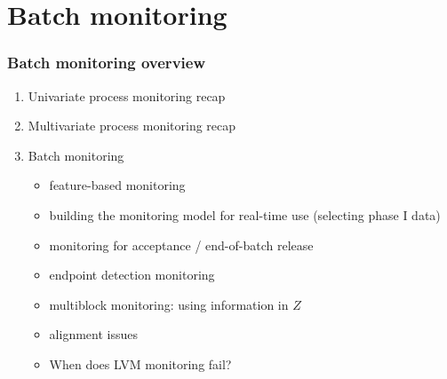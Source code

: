 \section{Batch monitoring}

\begin{frame}\frametitle{Batch monitoring overview}

\begin{enumerate}
	\item 	Univariate process monitoring recap
	
	\item	Multivariate process monitoring recap
	
	\item	Batch monitoring
	
		\begin{itemize}
			\item	feature-based monitoring			
			\item	building the monitoring model for real-time use (selecting phase I data)
			\item	monitoring for acceptance / end-of-batch release
			\item	endpoint detection monitoring
			\item	multiblock monitoring: using information in \( Z \)			
			\item	alignment issues
			\item 	When does LVM monitoring fail?
		\end{itemize}
\end{enumerate}
\end{frame}

